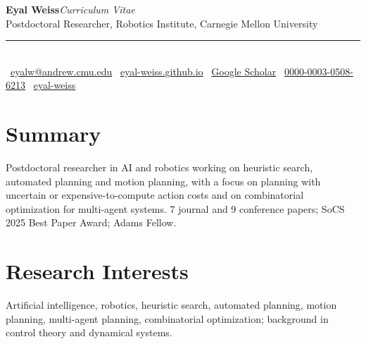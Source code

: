 \documentclass[10pt,letterpaper]{article}
\let\origsection\section
\renewcommand{\section}[1]{\Needspace*{5\baselineskip}\origsection{#1}}
\begin{document}
{\rmfamily\bfseries\Huge Eyal Weiss}\hfill{\rmfamily\large\itshape\color{dategray}Curriculum Vitae}\\[2pt]
{\rmfamily Postdoctoral Researcher, Robotics Institute, Carnegie Mellon University}\\[5pt]
{\color{rulegray}\rule{\textwidth}{0.8pt}}\\[4pt]
{\small
\faEnvelope\ \href{mailto:eyalw@andrew.cmu.edu}{eyalw@andrew.cmu.edu}\quad
\faGlobe\ \href{https://eyal-weiss.github.io}{eyal-weiss.github.io}\quad
\faGraduationCap\ \href{https://scholar.google.com/citations?user=LO5sHMIAAAAJ}{Google Scholar}\quad
\faOrcid\ \href{https://orcid.org/0000-0003-0508-6213}{0000-0003-0508-6213}\quad
\faGithub\ \href{https://github.com/eyal-weiss}{eyal-weiss}
}

\section{Summary}
Postdoctoral researcher in AI and robotics working on heuristic search, automated planning and motion planning, with a focus on planning with uncertain or expensive-to-compute action costs and on combinatorial optimization for multi-agent systems. 7 journal and 9 conference papers; SoCS 2025 Best Paper Award; Adams Fellow.

\section{Research Interests}
Artificial intelligence, robotics, heuristic search, automated planning, motion planning, multi-agent planning, combinatorial optimization; background in control theory and dynamical systems.
\end{document}
